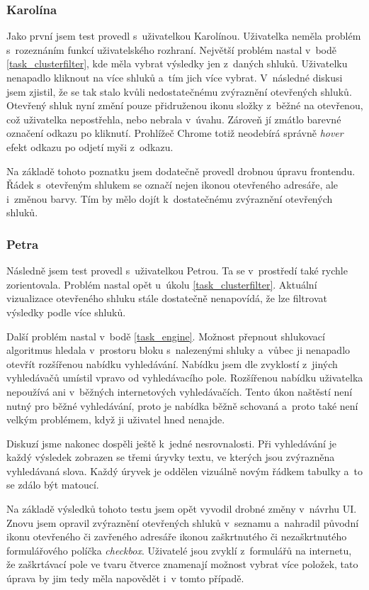 \subsubsection{Karolína}
Jako první jsem test provedl s~uživatelkou Karolínou. Uživatelka neměla problém s~rozeznáním funkcí uživatelského rozhraní. Největší problém nastal v~bodě \ref{task_clusterfilter}, kde měla vybrat výsledky jen z~daných shluků. Uživatelku nenapadlo kliknout na více shluků a~tím jich více vybrat. V~následné diskusi jsem zjistil, že se tak stalo kvůli nedostatečnému zvýraznění otevřených shluků. Otevřený shluk nyní změní pouze přidruženou ikonu složky z~běžné na otevřenou, což uživatelka nepostřehla, nebo nebrala v~úvahu. Zároveň jí zmátlo barevné označení odkazu po kliknutí. Prohlížeč Chrome totiž neodebírá správně \emph{hover} efekt odkazu po odjetí myši z~odkazu.

Na základě tohoto poznatku jsem dodatečně provedl drobnou úpravu frontendu. Řádek s~otevřeným shlukem se označí nejen ikonou otevřeného adresáře, ale i~změnou barvy. Tím by mělo dojít k~dostatečnému zvýraznění otevřených shluků.

\subsubsection{Petra}
Následně jsem test provedl s~uživatelkou Petrou. Ta se v~prostředí také rychle zorientovala. Problém nastal opět u~úkolu \ref{task_clusterfilter}. Aktuální vizualizace otevřeného shluku stále dostatečně nenapovídá, že lze filtrovat výsledky podle více shluků.

Další problém nastal v~bodě \ref{task_engine}. Možnost přepnout shlukovací algoritmus hledala v~prostoru bloku s~nalezenými shluky a~vůbec ji nenapadlo otevřít rozšířenou nabídku vyhledávání. Nabídku jsem dle zvyklostí z~jiných vyhledávačů umístil vpravo od vyhledávacího pole. Rozšířenou nabídku uživatelka nepoužívá ani v~běžných internetových vyhledávačích. Tento úkon naštěstí není nutný pro běžné vyhledávání, proto je nabídka běžně schovaná a~proto také není velkým problémem, když ji uživatel hned nenajde. 

Diskuzí jsme nakonec dospěli ještě k~jedné nesrovnalosti. Při vyhledávání je každý výsledek zobrazen se třemi úryvky textu, ve kterých jsou zvýrazněna vyhledávaná slova. Každý úryvek je oddělen vizuálně novým řádkem tabulky a~to se zdálo být matoucí.

Na základě výsledků tohoto testu jsem opět vyvodil drobné změny v~návrhu UI. Znovu jsem opravil zvýraznění otevřených shluků v~seznamu a~nahradil původní ikonu otevřeného či zavřeného adresáře ikonou zaškrtnutého či nezaškrtnutého formulářového políčka \emph{checkbox}. Uživatelé jsou zvyklí z~formulářů na internetu, že zaškrtávací pole ve tvaru čtverce znamenají možnost vybrat více položek, tato úprava by jim tedy měla napovědět i~v tomto případě.

